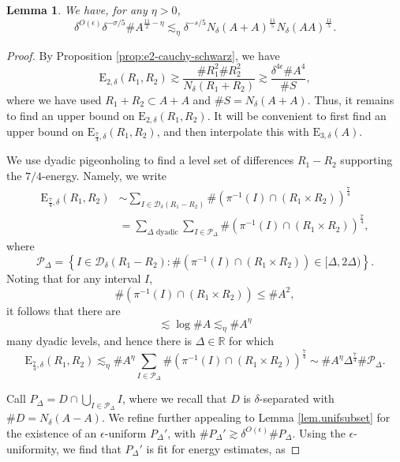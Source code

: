 \documentclass[12pt]{amsart}
\newtheorem{lemma}[theorem]{Lemma}
\newcommand{\1}{\mathbf{1}}
\newcommand{\de}{\delta}
\newcommand{\cn}[1]{N_\de({#1})}
\begin{document}
\begin{lemma}\label{lem.sumlowerbounds}
We have, for any \(\eta > 0\), 
\[
    \delta^{O(\epsilon)} \delta^{- \sigma / 5    } \# A ^{\frac{11}{2} - \eta }\lesssim_{\eta}  \delta^{- s /5} N_{\delta} (A+A) ^{\frac{11}{5} } N_{\delta} (AA)^{\frac{11}{5} }
.\]
\end{lemma}
\begin{proof}
By Proposition \ref{prop:e2-cauchy-schwarz}, we have
\begin{equation} \label{eq:rr-lower-bound}
	\mathrm{E} _{2,\delta} (R_1,R_2) \gtrsim \frac{\# R_1 ^{2} \# R_2 ^{2}}{\cn{R_1 + R_2}} \gtrsim \frac{\delta^{4\epsilon} \# A ^{4}}{\# S},
\end{equation}
where we have used \(R_{1} + R_{2} \subset A + A\) and \(\# S = N_{\delta} (A+A)\). Thus, it remains to find
an upper bound on \(\mathrm{E} _{2,\delta} (R_1,R_2)\). It will be convenient to first find an
upper bound on \(\mathrm{E} _{\frac{7}{4}  ,\delta} (R_1,R_2)\), and then interpolate this with \(\mathrm{E} _{3,\delta} (A)\).

We use dyadic pigeonholing to find a level set of differences \(R_1-R_2\) supporting the \(7 / 4 \)-energy.
Namely, we write
\begin{align*}
	\mathrm{E} _{\frac{7}{4}  ,\delta} (R_1,R_2) & \sim \sum _{I \in \mathcal{D} _{\delta} (R_1-R_2)} \# \left( \pi ^{-1} (I) \cap (R_1 \times R_2)  \right) ^{\frac{7}{4}  }\\
	& = \sum _{\Delta \text{ dyadic} } \sum _{I \in \mathcal{P} _{\Delta} } \# \left( \pi ^{-1} (I) \cap (R_1 \times R_2) \right) ^{\frac{7}{4}  },
\end{align*}
where
\[
	\mathcal{P} _{\Delta} = \left\{ I \in \mathcal{D} _{\delta} (R_1 - R_2) : \# \left( \pi ^{-1} (I) \cap \left( R_1 \times R_2 \right)  \right) 	\in [\Delta,2\Delta) \right\} 
.\]	
Noting that for any interval \(I\),
\[
	\# \left( \pi ^{-1} (I) \cap (R_1 \times R_2) \right) \leq \# A ^{2}
,\]
it follows that there are
\[
	\lesssim \log \# A \lesssim _{\eta} \# A ^{\eta}
\]
many dyadic levels, and hence there is \(\Delta \in \mathbb{R} \) for which
\[
	\mathrm{E} _{\frac{7}{4} ,\delta} (R_1,R_2) \lesssim _{\eta} \# A ^{\eta} \sum _{I \in \mathcal{P} _{\Delta} } \#\left( \pi ^{-1} (I) \cap (R_1 \times R_2) \right) ^{\frac{7}{4}  } \sim \# A^{\eta} \Delta ^{\frac{7}{4}  } \# \mathcal{P} _{\Delta} 
.\]


Call \(P_{\Delta} = D \cap \bigcup _{I \in \mathcal{P} _{\Delta} } I\), where we recall that \(D\) is \(\delta\)-separated with \(\# D = N_{\delta} (A-A)\). 
We refine further appealing to Lemma \ref{lem.unifsubset} for the existence of
an \(\epsilon\)-uniform \(P_{\Delta} '\), with \(\# P_{\Delta} '\gtrsim \delta^{O(\epsilon)} \# P_{\Delta}  \).
Using the \(\epsilon\)-uniformity, we find that \(P_{\Delta} '\) is fit for energy estimates,
as


\end{proof}
\end{document}
